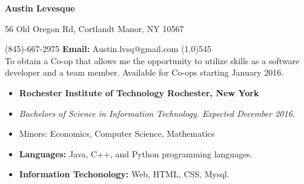 \documentclass[10pt]{article}
\begin{document}
\centerline{\Large \bf Austin Levesque}
\vspace{.5ex}
\centerline{56 Old Oregon Rd, Cortlandt Manor, NY 10567}
\vspace{1ex}
 (845)-667-2975 \hfill {\bf Email:} Austin.lvsq@gmail.com
\line(1,0){545}\\
To obtain a Co-op that allows me the opportunity to utilize skills as a software developer and a team member. Available for Co-ops starting January 2016.
\vspace{1ex}\\
\begin{itemize}[topsep=1ex, itemsep=0ex, partopsep=0ex, parsep=0ex]
	\item[]{{\bf Rochester Institute of Technology \hfill Rochester, New York}}
  \item[]{\it Bachelors of Science in Information Technology. \hfill Expected December 2016.}
  \item[] Minors: Economics, Computer Science, Mathematics
\end{itemize}
\vspace{1ex}
\begin{itemize} [topsep=.5ex, itemsep=0ex, partopsep=0ex, parsep=1ex]
	\item[] {\bf Languages:} Java, C++, and Python programming languages.
 	\item[] {\bf Information Techonology:} Web, HTML, CSS, Mysql.
\end{itemize}
\vspace{1ex}
\end{document}
